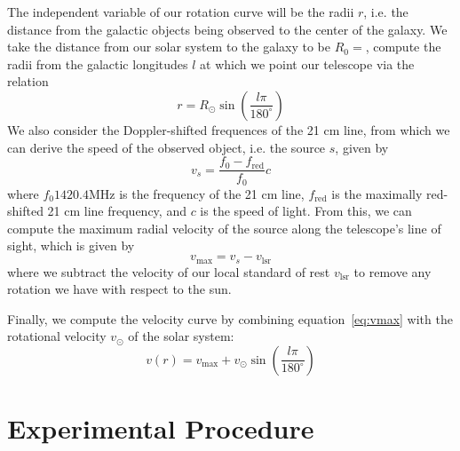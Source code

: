 \documentclass[aps,twocolumn,secnumarabic,balancelastpage,amsmath,amssymb,nofootinbib, floatfix]{revtex4-2}
\begin{document}
	The independent variable of our rotation curve will be the radii $r$, i.e. the distance from the galactic objects being observed to the center of the galaxy. We take the distance from our solar system to the galaxy to be $R_{0}=$, compute the radii from the galactic longitudes $l$ at which we point our telescope via the relation
	\begin{equation}
		r=R_{\odot}\sin(\frac{l\pi}{180^{\circ}})
		\label{eq:radii}
	\end{equation}
	We also consider the Doppler-shifted frequences of the 21 cm line, from which we can derive the speed of the observed object, i.e. the source $s$, given by 
	\begin{equation}
		v_{s}=\frac{f_{0}-f_{\mathrm{red}}}{f_{0}}c
		\label{eq:doppler}
	\end{equation}
	where $f_{0}1420.4$MHz is the frequency of the 21 cm line, $f_{\mathrm{red}}$ is the maximally red-shifted 21 cm line frequency, and $c$ is the speed of light. 
	From this, we can compute the maximum radial velocity of the source along the telescope's line of sight, which is given by 
	\begin{equation}
		v_{\mathrm{max}}=v_{s}-v_{\mathrm{lsr}}
		\label{eq:vmax}
	\end{equation}
	where we subtract the velocity of our local standard of rest $v_{\mathrm{lsr}}$ to remove any rotation we have with respect to the sun.
	
	Finally, we compute the velocity curve by combining equation~\ref{eq:vmax} with the rotational velocity $v_{\odot}$ of the solar system:
	\begin{equation}
		v(r)=v_{\mathrm{max}}+v_{\odot}\sin(\frac{l\pi}{180^{\circ}})
	\end{equation}

	
	\section{Experimental Procedure}
\end{document}
